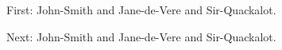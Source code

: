 \documentclass{article}
\begin{document}
First: \gls{John-Smith} and \gls{Jane-de-Vere} and
\gls{Sir-Quackalot}.

Next: \gls{John-Smith} and \gls{Jane-de-Vere} and
\gls{Sir-Quackalot}.

\printunsrtglossary
\end{document}
